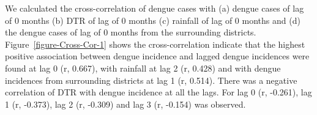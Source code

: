 \documentclass{bmcart}
\begin{document}





We calculated the cross-correlation of dengue cases with (a) dengue cases of lag of 0 months (b) DTR of lag of 0 months (c) rainfall of lag of 0 months and (d) the dengue cases of lag of 0 months from the surrounding districts.  
Figure~\ref{figure-Cross-Cor-1} shows the cross-correlation indicate that the highest positive association between dengue incidence and lagged dengue incidences were found at lag 0 (r, 0.667), with rainfall at lag 2 (r, 0.428) and with dengue incidences from surrounding districts at lag 1 (r, 0.514). There was a negative correlation of DTR with dengue incidence at all the lags. For lag 0 (r, -0.261), lag 1 (r, -0.373), lag 2 (r,  -0.309) and lag 3 (r,  -0.154) was observed. 






\end{document}
